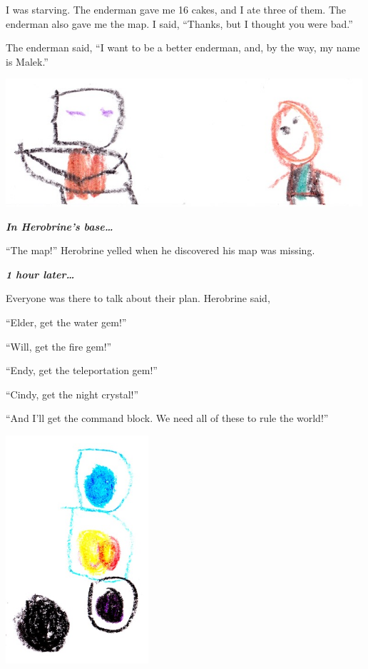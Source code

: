 \documentclass[letterpaper, oneside, 12pt]{krantz}
\begin{document}
I was starving. The enderman gave me 16 cakes, and I ate three of them.
The enderman also gave me the map. I said, ``Thanks, but I thought you
were bad.''

The enderman said, ``I want to be a better enderman, and, by the way, my
name is Malek.''

\includegraphics[width=5.20833in,height=\textheight]{img/final-war/malek-beckett.jpg}

\textbf{\emph{In Herobrine's base\ldots{}}}

``The map!'' Herobrine yelled when he discovered his map was missing.

\textbf{\emph{1 hour later\ldots{}}}

Everyone was there to talk about their plan. Herobrine said,

``Elder, get the water gem!''

``Will, get the fire gem!''

``Endy, get the teleportation gem!''

``Cindy, get the night crystal!''

``And I'll get the command block. We need all of these to rule the
world!''

\includegraphics[width=2.08333in,height=\textheight]{img/final-war/crystals.jpg}
\end{document}
